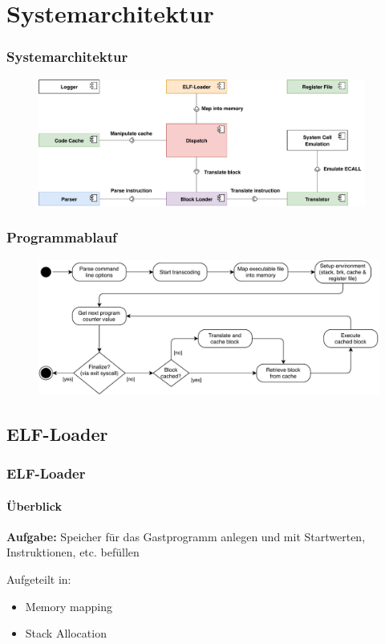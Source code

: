 \documentclass[german]{tum-presentation}
\begin{document}
\section{Systemarchitektur}
\begin{frame}
	\frametitle{Systemarchitektur}
	\begin{figure}
		\includegraphics[width=0.96\textwidth]{diagrams/components}
	\end{figure}
\end{frame}

\begin{frame}
	\frametitle{Programmablauf}
	\begin{figure}
		\includegraphics[width=\textwidth]{diagrams/strategy}
	\end{figure}
\end{frame}

\subsection{ELF-Loader} %
\begin{frame}
	\frametitle{ELF-Loader}
	\framesubtitle{Überblick}
	\textbf{Aufgabe:} Speicher für das Gastprogramm anlegen und mit Startwerten, Instruktionen, etc. befüllen

	\vspace{0.25cm}
	Aufgeteilt in:
	\begin{itemize}
		\item Memory mapping
		\item Stack Allocation
	\end{itemize}
\end{frame}
\end{document}
